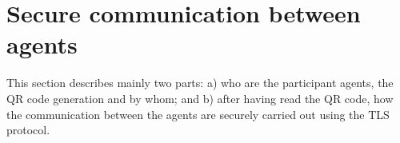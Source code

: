 \section{Secure communication between agents}
\label{sec:client}
This section describes mainly two parts: 
a) who are the participant agents, the QR code generation and by whom; and 
b) after having read the QR code, how the communication between the agents are securely 
carried out using the TLS protocol.



